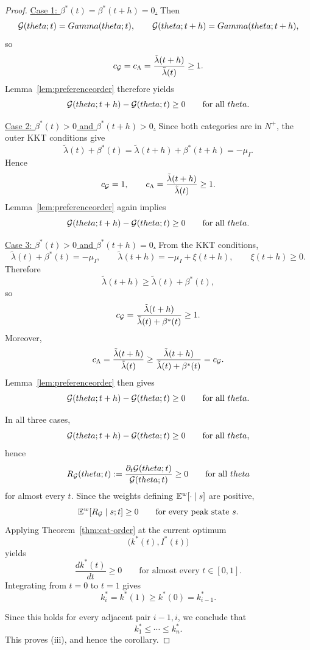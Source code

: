 \documentclass[master.tex]{subfiles}
\begin{document}
\begin{proof}
\smallskip
\noindent\underline{Case 1: \(\beta^\ast(t)=\beta^\ast(t+h)=0\).}
Then
\[
\mathcal{G}(theta;t)=Gamma(theta;t),
\qquad
\mathcal{G}(theta;t+h)=Gamma(theta;t+h),
\]
so
\[
c_{\mathcal{G}}=c_\Lambda=\frac{\tilde\lambda(t+h)}{\tilde\lambda(t)}\ge 1.
\]
Lemma~\ref{lem:preferenceorder} therefore yields
\[
\mathcal{G}(theta;t+h)-\mathcal{G}(theta;t)\ge 0
\qquad
\text{for all }theta.
\]

\smallskip
\noindent\underline{Case 2: \(\beta^\ast(t)>0\) and \(\beta^\ast(t+h)>0\).}
Since both categories are in \(N^+\), the outer KKT conditions give
\[
\tilde\lambda(t)+\beta^\ast(t)
=
\tilde\lambda(t+h)+\beta^\ast(t+h)
=
-\mu_I.
\]
Hence
\[
c_{\mathcal{G}}=1,
\qquad
c_\Lambda=\frac{\tilde\lambda(t+h)}{\tilde\lambda(t)}\ge 1.
\]
Lemma~\ref{lem:preferenceorder} again implies
\[
\mathcal{G}(theta;t+h)-\mathcal{G}(theta;t)\ge 0
\qquad
\text{for all }theta.
\]

\smallskip
\noindent\underline{Case 3: \(\beta^\ast(t)>0\) and \(\beta^\ast(t+h)=0\).}
From the KKT conditions,
\[
\tilde\lambda(t)+\beta^\ast(t)=-\mu_I,
\qquad
\tilde\lambda(t+h)=-\mu_I+\xi(t+h),
\qquad
\xi(t+h)\ge 0.
\]
Therefore
\[
\tilde\lambda(t+h)\ge \tilde\lambda(t)+\beta^\ast(t),
\]
so
\[
c_{\mathcal{G}}
=
\frac{\tilde\lambda(t+h)}{\tilde\lambda(t)+\beta^\ast(t)}
\ge 1.
\]
Moreover,
\[
c_\Lambda
=
\frac{\tilde\lambda(t+h)}{\tilde\lambda(t)}
\ge
\frac{\tilde\lambda(t+h)}{\tilde\lambda(t)+\beta^\ast(t)}
=
c_{\mathcal{G}}.
\]
Lemma~\ref{lem:preferenceorder} then gives
\[
\mathcal{G}(theta;t+h)-\mathcal{G}(theta;t)\ge 0
\qquad
\text{for all }theta.
\]

\smallskip
In all three cases,
\[
\mathcal{G}(theta;t+h)-\mathcal{G}(theta;t)\ge 0
\qquad
\text{for all }theta,
\]
hence
\[
R_{\mathcal{G}}(theta;t):=
\frac{\partial_t\mathcal{G}(theta;t)}{\mathcal{G}(theta;t)}
\ge 0
\qquad
\text{for all }theta
\]
for almost every \(t\). Since the weights defining \(\mathbb{E}^w[\cdot\mid s]\) are positive,
\[
\mathbb{E}^w\!\left[R_{\mathcal{G}}\mid s;t\right]\ge 0
\qquad
\text{for every peak state } s.
\]
Applying Theorem~\ref{thm:cat-order} at the current optimum
\[
\bigl(k^\ast(t),I^\ast(t)\bigr)
\]
yields
\[
\frac{d k^\ast(t)}{dt}\ge 0
\qquad
\text{for almost every } t\in[0,1].
\]
Integrating from \(t=0\) to \(t=1\) gives
\[
k_i^\ast=k^\ast(1)\ge k^\ast(0)=k_{i-1}^\ast.
\]

Since this holds for every adjacent pair \(i-1,i\), we conclude that
\[
k_1^\ast\le \cdots \le k_n^\ast.
\]
This proves (iii), and hence the corollary.
\end{proof}


\end{document}
